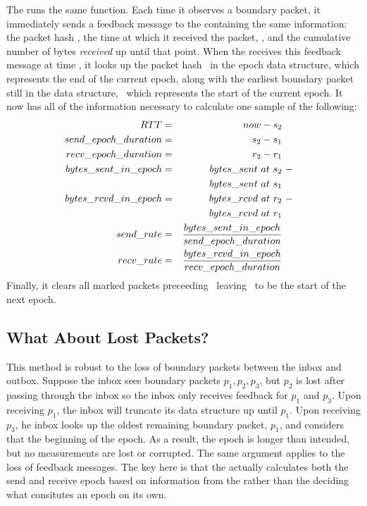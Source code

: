 The \outbox runs the same function. Each time it observes a boundary packet, 
it immediately sends a feedback message to the \inbox containing the same information:
the packet hash \hptwo, the time at which it received the packet, \rtwo, and the cumulative number of bytes
\emph{received} up until that point. When the \inbox receives this feedback message at time \atwo, it looks up the
packet hash \hptwo\ in the epoch data structure, which represents the end of the current epoch,
along with the earliest boundary packet still in the data structure, \hpone\ which represents the start
of the current epoch. It now has all of the information necessary to calculate one sample of the following:
\begin{subequations}
    \begin{align}
        RTT &= &now - s_2 \\
        send\_epoch\_duration &= &s_2 - s_1\\
        recv\_epoch\_duration &= &r_2 - r_1\\
        bytes\_sent\_in\_epoch &= &bytes\_sent\ at\ s_2 &\ - \\
                                    &&bytes\_sent\ at\ s_1&\notag\\
        bytes\_rcvd\_in\_epoch &= &bytes\_rcvd\ at\ r_2 &\ - \\
                                &&bytes\_rcvd\ at\ r_1\notag\\
        send\_rate &= &\frac{bytes\_sent\_in\_epoch}{send\_epoch\_duration}\\
        recv\_rate &= &\frac{bytes\_rcvd\_in\_epoch}{recv\_epoch\_duration}
    \end{align}
\end{subequations}
Finally, it clears all marked packets preceeding \ptwo\ leaving \ptwo\
to be the start of the next epoch.


\subsection{What About Lost Packets?}
\label{s:measure:loss}
This method is robust to the loss of boundary packets between the inbox and outbox.
Suppose the inbox sees boundary packets $p_1, p_2, p_3$, but $p_2$ is lost after passing through
the inbox so the inbox only receives feedback for $p_1$ and $p_3$. Upon receiving $p_1$, 
the inbox will truncate its data structure up until $p_1$. Upon receiving $p_3$, he inbox 
looks up the oldest remaining boundary packet, $p_1$, and considers that the beginning of the epoch.
As a result, the epoch is longer than intended, but no measurements are lost or corrupted. 
The same argument applies to the loss of feedback messages. 
The key here is that the \inbox actually calculates both the send and receive epoch based on information
from the \outbox rather than the \outbox deciding what consitutes an epoch on its own. 


